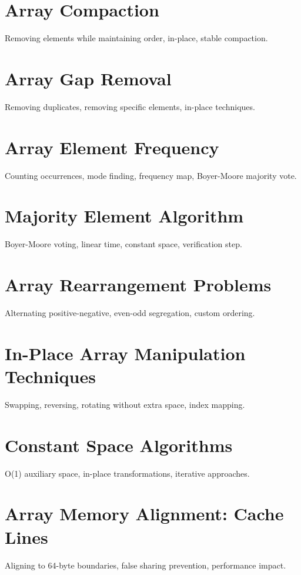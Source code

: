 \chapter{Array Compaction}
Removing elements while maintaining order, in-place, stable compaction.

\chapter{Array Gap Removal}
Removing duplicates, removing specific elements, in-place techniques.

\chapter{Array Element Frequency}
Counting occurrences, mode finding, frequency map, Boyer-Moore majority vote.

\chapter{Majority Element Algorithm}
Boyer-Moore voting, linear time, constant space, verification step.

\chapter{Array Rearrangement Problems}
Alternating positive-negative, even-odd segregation, custom ordering.

\chapter{In-Place Array Manipulation Techniques}
Swapping, reversing, rotating without extra space, index mapping.

\chapter{Constant Space Algorithms}
O(1) auxiliary space, in-place transformations, iterative approaches.


\chapter{Array Memory Alignment: Cache Lines}
Aligning to 64-byte boundaries, false sharing prevention, performance impact.

